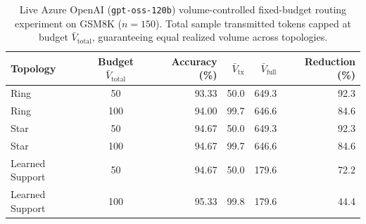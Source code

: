 \begin{table}[h]
\centering
\caption{Live Azure OpenAI (\texttt{gpt-oss-120b}) volume-controlled fixed-budget routing experiment on GSM8K ($n=150$). 
Total sample transmitted tokens capped at budget $\bar{V}_{\text{total}}$, guaranteeing equal realized volume across topologies.}
\label{tab:fixed_budget_live}
\small
\begin{tabular}{lcrrrr}
\toprule
Topology & Budget $\bar{V}_{\text{total}}$ & Accuracy (\%) & $\bar{V}_{\text{tx}}$ & $\bar{V}_{\text{full}}$ & Reduction (\%) \\
\midrule
Ring & 50 & 93.33 & 50.0 & 649.3 & 92.3 \\
Ring & 100 & 94.00 & 99.7 & 646.6 & 84.6 \\
Star & 50 & 94.67 & 50.0 & 649.3 & 92.3 \\
Star & 100 & 94.67 & 99.7 & 646.6 & 84.6 \\
Learned Support & 50 & 94.67 & 50.0 & 179.6 & 72.2 \\
Learned Support & 100 & 95.33 & 99.8 & 179.6 & 44.4 \\
\bottomrule
\end{tabular}
\end{table}
